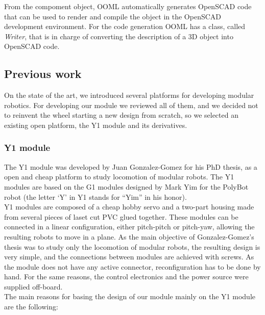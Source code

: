 From the compoment object, OOML automatically generates OpenSCAD code that can be used to render and compile the object in the OpenSCAD development environment. For the code generation OOML has a class, called \emph{Writer}, that is in charge of converting the description of a 3D object into OpenSCAD code.\\

\subsection{Previous work}
\label{hardware_previouswork}

On the state of the art, we introduced several platforms for developing modular robotics. For developing our module we reviewed all of them, and we decided not to reinvent the wheel starting a new design from scratch, so we selected an existing open platform, the Y1 module and its derivatives.

\subsubsection{Y1 module}
\label{hardware_y1}

The Y1 module \cite{gonzalez-gomez_website:y1} was developed by Juan Gonzalez-Gomez for his PhD thesis, as a open and cheap platform to study locomotion of modular robots. The Y1 modules are based on the G1 modules designed by Mark Yim \cite{Yim2000} for the PolyBot robot (the letter `Y' in Y1 stands for ``Yim'' in his honor).\\

Y1 modules are composed of a cheap hobby servo and a two-part housing made from several pieces of laset cut PVC glued together. These modules can be connected in a linear configuration, either pitch-pitch or pitch-yaw, allowing the resulting robots to move in a plane. As the main objective of Gonzalez-Gomez's thesis was to study only the locomotion of modular robots, the resulting design is very simple, and the connections between modules are achieved with screws. As the module does not have any active connector, reconfiguration has to be done by hand. For the same reasons, the control electronics and the power source were supplied off-board.\\

The main reasons for basing the design of our module mainly on the Y1 module are the following:

